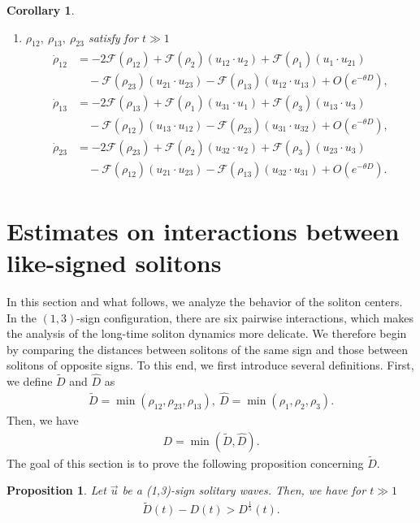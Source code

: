 \documentclass[reqno]{amsart}
\theoremstyle{plain}
\newtheorem{proposition}[theorem]{Proposition}
\newtheorem{corollary}[theorem]{Corollary}
\theoremstyle{definition}
\numberwithin{equation}{section}
\newcommand{\1}{\mathbbm{1}}
\begin{document}
\begin{corollary}
\begin{enumerate}
\item $\rho_{12},\ \rho_{13},\ \rho_{23}$ satisfy for $t\gg 1$
\begin{align}\label{rhojkes10210}
\begin{aligned}
\dot{\rho}_{12}&=-2\mathcal{F}(\rho_{12})+\mathcal{F}(\rho_2)(u_{12}\cdot u_2)+\mathcal{F}(\rho_1)(u_1\cdot u_{21})
\\
&\quad -\mathcal{F}(\rho_{23})(u_{21}\cdot u_{23})-\mathcal{F}(\rho_{13})(u_{12}\cdot u_{13})+O\left(e^{-\theta D}\right),
\\
\dot{\rho}_{13}&=-2\mathcal{F}(\rho_{13})+\mathcal{F}(\rho_1)(u_{31}\cdot u_1)+\mathcal{F}(\rho_3)(u_{13}\cdot u_3)
\\
&\quad-\mathcal{F}(\rho_{12})(u_{13}\cdot u_{12})-\mathcal{F}(\rho_{23})(u_{31}\cdot u_{32})+O\left(e^{-\theta D}\right),
\\
\dot{\rho}_{23}&=-2\mathcal{F}(\rho_{23})+\mathcal{F}(\rho_2)(u_{32}\cdot u_2)+\mathcal{F}(\rho_3)(u_{23}\cdot u_3)
\\
&\quad-\mathcal{F}(\rho_{12})(u_{21}\cdot u_{23})-\mathcal{F}(\rho_{13})(u_{32}\cdot u_{31})+O\left(e^{-\theta D}\right).
\end{aligned}
\end{align}
\end{enumerate}
\end{corollary}




\section{Estimates on interactions between like-signed solitons}
In this section and what follows, we analyze the behavior of the soliton centers. In the $(1,3)$-sign configuration, there are six pairwise interactions, which makes the analysis of the long-time soliton dynamics more delicate. We therefore begin by comparing the distances between solitons of the same sign and those between solitons of opposite signs. To this end, we first introduce several definitions. First, we define $\tilde{D}$ and $\hat{D}$ as
\begin{align}\label{tildehatD}
\tilde{D}=\min{(\rho_{12},\rho_{23},\rho_{13})},\ \hat{D}=\min{(\rho_1,\rho_2,\rho_3)}.
\end{align}
Then, we have
\begin{align}\label{Datarimae1}
D=\min{(\tilde{D},\hat{D})}.
\end{align}
The goal of this section is to prove the following proposition concerning $\tilde{D}$.
\begin{proposition}\label{tildeDnagai}
Let $\vec{u}$ be a (1,3)-sign solitary waves. Then, we have for $t\gg 1$
\begin{align}\label{tildeDnagaieq}
\tilde{D}(t)-D(t)>D^{\frac{1}{5}}(t).
\end{align}
\end{proposition}
\end{document}
